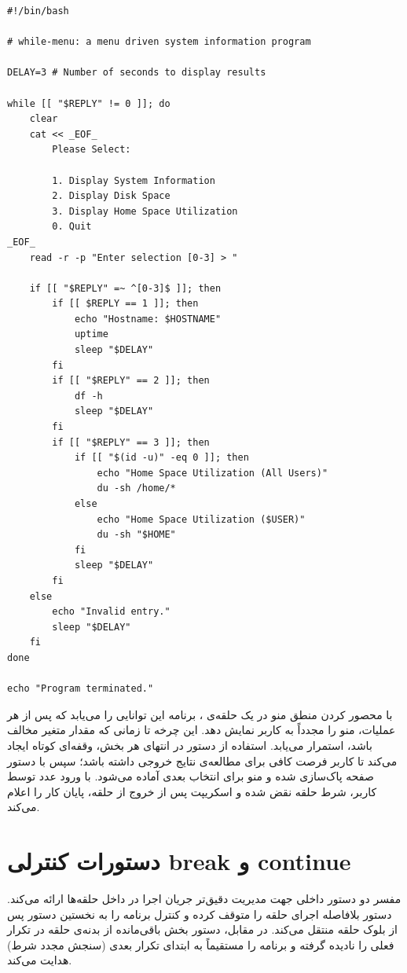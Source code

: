 \begin{latin}
\begin{lstlisting}
#!/bin/bash

# while-menu: a menu driven system information program

DELAY=3 # Number of seconds to display results

while [[ "$REPLY" != 0 ]]; do
    clear
    cat << _EOF_
        Please Select:

        1. Display System Information
        2. Display Disk Space
        3. Display Home Space Utilization
        0. Quit
_EOF_
    read -r -p "Enter selection [0-3] > "

    if [[ "$REPLY" =~ ^[0-3]$ ]]; then
        if [[ $REPLY == 1 ]]; then
            echo "Hostname: $HOSTNAME"
            uptime
            sleep "$DELAY"
        fi
        if [[ "$REPLY" == 2 ]]; then
            df -h
            sleep "$DELAY"
        fi
        if [[ "$REPLY" == 3 ]]; then
            if [[ "$(id -u)" -eq 0 ]]; then
                echo "Home Space Utilization (All Users)"
                du -sh /home/*
            else
                echo "Home Space Utilization ($USER)"
                du -sh "$HOME"
            fi
            sleep "$DELAY"
        fi
    else
        echo "Invalid entry."
        sleep "$DELAY"
    fi
done

echo "Program terminated."
\end{lstlisting}
\end{latin}

با محصور کردن منطق منو در یک حلقه‌ی ، برنامه این توانایی را می‌یابد که پس از هر عملیات، منو را مجدداً به کاربر نمایش دهد. این چرخه تا زمانی که مقدار متغیر  مخالف  باشد، استمرار می‌یابد. استفاده از دستور  در انتهای هر بخش، وقفه‌ای کوتاه ایجاد می‌کند تا کاربر فرصت کافی برای مطالعه‌ی نتایج خروجی داشته باشد؛ سپس با دستور  صفحه پاک‌سازی شده و منو برای انتخاب بعدی آماده می‌شود. با ورود عدد  توسط کاربر، شرط حلقه نقض شده و اسکریپت پس از خروج از حلقه، پایان کار را اعلام می‌کند.

\section{دستورات کنترلی break و continue}

مفسر  دو دستور داخلی جهت مدیریت دقیق‌تر جریان اجرا در داخل حلقه‌ها ارائه می‌کند. دستور  بلافاصله اجرای حلقه را متوقف کرده و کنترل برنامه را به نخستین دستور پس از بلوک حلقه منتقل می‌کند. در مقابل، دستور  بخش باقی‌مانده از بدنه‌ی حلقه در تکرار فعلی را نادیده گرفته و برنامه را مستقیماً به ابتدای تکرار بعدی (سنجش مجدد شرط) هدایت می‌کند.

